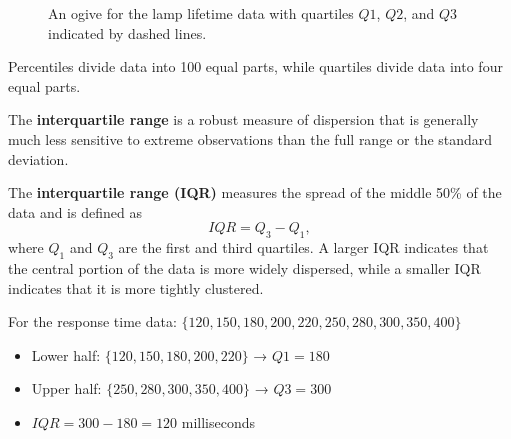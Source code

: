 \begin{example}
\begin{figure}[h!]
\caption{An ogive for the lamp lifetime data with quartiles $Q1$, $Q2$, and $Q3$ indicated by dashed lines.}
\label{fig:lamp_life_ogive_quartiles}
\end{figure}

\end{example}

Percentiles divide data into 100 equal parts, while quartiles divide data into four equal parts.

The \textbf{interquartile range} is a robust measure of dispersion that is generally much less sensitive to extreme observations than the full range or the standard deviation.

\newpage
\begin{definition}
    The \textbf{interquartile range (IQR)} measures the spread of the middle 50\% of the data and is defined as
    $$
    IQR = Q_3 - Q_1,
    $$
    where $Q_1$ and $Q_3$ are the first and third quartiles. A larger IQR indicates that the central portion of the data is more widely dispersed, while a smaller IQR indicates that it is more tightly clustered.
\end{definition}


\begin{example}\par

For the response time data: $\{120, 150, 180, 200, 220, 250, 280, 300, 350, 400\}$

\begin{itemize}
    \item Lower half: $\{120, 150, 180, 200, 220\}$ → $Q1 = 180$
    \item Upper half: $\{250, 280, 300, 350, 400\}$ → $Q3 = 300$
    \item $IQR = 300 - 180 = 120$ milliseconds
\end{itemize}
\end{example}


